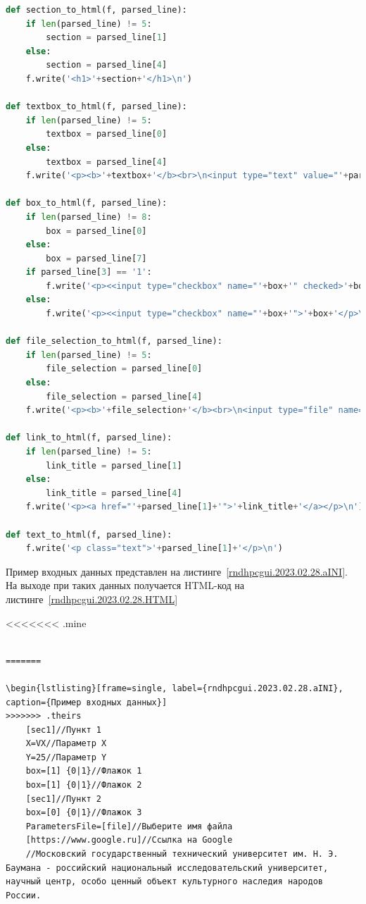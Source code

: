 \begin{lstlisting}[frame=single, label={rndhpcgui.2023.02.28.generation}, caption={Функции записи HTML-кода элементов интерфейса}, language={Python}]
	def section_to_html(f, parsed_line):
    if len(parsed_line) != 5:
        section = parsed_line[1]
    else:
        section = parsed_line[4]
    f.write('<h1>'+section+'</h1>\n')

def textbox_to_html(f, parsed_line):
    if len(parsed_line) != 5:
        textbox = parsed_line[0]
    else:
        textbox = parsed_line[4]
    f.write('<p><b>'+textbox+'</b><br>\n<input type="text" value="'+parsed_line[2]+'"></p>\n')

def box_to_html(f, parsed_line):
    if len(parsed_line) != 8:
        box = parsed_line[0]
    else:
        box = parsed_line[7]
    if parsed_line[3] == '1':
        f.write('<p><<input type="checkbox" name="'+box+'" checked>'+box+'</p>\n')
    else:
        f.write('<p><<input type="checkbox" name="'+box+'">'+box+'</p>\n')

def file_selection_to_html(f, parsed_line):
    if len(parsed_line) != 5:
        file_selection = parsed_line[0]
    else:
        file_selection = parsed_line[4]
    f.write('<p><b>'+file_selection+'</b><br>\n<input type="file" name="file"></p>\n')

def link_to_html(f, parsed_line):
    if len(parsed_line) != 5:
        link_title = parsed_line[1]
    else:
        link_title = parsed_line[4]
    f.write('<p><a href="'+parsed_line[1]+'">'+link_title+'</a></p>\n')

def text_to_html(f, parsed_line):
    f.write('<p class="text">'+parsed_line[1]+'</p>\n')
\end{lstlisting}


Пример входных данных представлен на листинге~\ref{rndhpcgui.2023.02.28.aINI}. На выходе при таких данных получается HTML-код на листинге~\ref{rndhpcgui.2023.02.28.HTML}

<<<<<<< .mine
\begin{lstlisting}[frame=single, label={rndhpcgui.2023.02.28.aINI}, caption={Пример входных данных}, language={aINIExample}]

=======

\begin{lstlisting}[frame=single, label={rndhpcgui.2023.02.28.aINI}, caption={Пример входных данных}] 
>>>>>>> .theirs
	[sec1]//Пункт 1
	X=VX//Параметр X
	Y=25//Параметр Y
	box=[1] {0|1}//Флажок 1
	box=[1] {0|1}//Флажок 2
	[sec1]//Пункт 2
	box=[0] {0|1}//Флажок 3
	ParametersFile=[file]//Выберите имя файла
	[https://www.google.ru]//Ссылка на Google
	//Московский государственный технический университет им. Н. Э. Баумана - российский национальный исследовательский университет, научный центр, особо ценный объект культурного наследия народов России.
\end{lstlisting}

